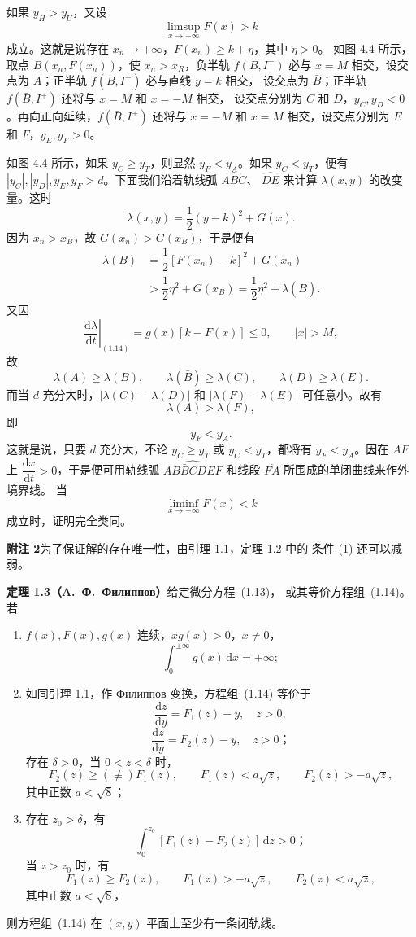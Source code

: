如果 $y_H>y_U$，又设
\[
  \limsup_{x\to+\infty}F(x)>k
\]
成立。这就是说存在 $x_n\to+\infty$，$F(x_n)\geq k+\eta$，其中 $\eta>0$。
如图 4.4 所示，取点 $B(x_n,F(x_n))$，使 $x_n>x_R$，负半轨 $f(B,I^-)$
必与 $x=M$ 相交，设交点为 $A$；正半轨 $f(B,I^+)$ 必与直线 $y=k$ 相交，
设交点为 $\bar B$；正半轨 $f(\bar B,I^+)$ 还将与 $x=M$ 和 $x=-M$ 相交，
设交点分别为 $C$ 和 $D$，$y_C,y_D<0$。再向正向延续，$f(\bar B,I^+)$ 还将与
$x=-M$ 和 $x=M$ 相交，设交点分别为 $E$ 和 $F$，$y_E,y_F>0$。

如图 4.4 所示，如果 $y_C\geq y_T$，则显然 $y_F<y_A$。如果 $y_C<y_T$，便有
$|y_C|,|y_D|,y_E,y_F>d$。下面我们沿着轨线弧 $\widehat{ABC}$、
$\widehat{DE}$ 来计算 $\lambda(x,y)$ 的改变量。这时
\[
  \lambda(x,y)=\dfrac12(y-k)^2+G(x).
\]
因为 $x_n>x_B$，故 $G(x_n)>G(x_B)$，于是便有
\[
\begin{aligned}
  \lambda(B)&=\dfrac12[F(x_n)-k]^2+G(x_n)\\
  &>\dfrac12\eta^2+G(x_B)
   =\dfrac12\eta^2+\lambda(\bar B).
\end{aligned}
\]
又因
\[
  \left.\dfrac{\mathrm{d}\lambda}{\mathrm{d}t}\right|_{(1.14)}
  =g(x)[k-F(x)]\leq0,\qquad |x|>M,
\]
故
\[
  \lambda(A)\geq\lambda(B),\qquad
  \lambda(\bar B)\geq\lambda(C),\qquad
  \lambda(D)\geq\lambda(E).
\]
而当 $d$ 充分大时，$|\lambda(C)-\lambda(D)|$ 和
$|\lambda(F)-\lambda(E)|$ 可任意小。故有
\[
  \lambda(A)>\lambda(F),
\]
即
\[
  y_F<y_A.
\]
这就是说，只要 $d$ 充分大，不论 $y_C\geq y_T$ 或 $y_C<y_T$，都将有
$y_F<y_A$。因在 $\overline{AF}$ 上 $\dfrac{\mathrm{d}x}{\mathrm{d}t}>0$，于是便可用轨线弧
$\widehat{AB\bar BCDEF}$ 和线段 $\overline{FA}$ 所围成的单闭曲线来作外境界线。
当
\[
  \liminf_{x\to-\infty}F(x)<k
\]
成立时，证明完全类同。

\noindent\textbf{附注 2}\quad 为了保证解的存在唯一性，由引理 1.1，定理 1.2 中的
条件 (1) 还可以减弱。

\noindent\textbf{定理 1.3（A.~Ф.~Филиппов\cite{8}）}\quad 给定微分方程~(1.13)，
或其等价方程组~(1.14)。若
\begin{enumerate}
  \item $f(x),F(x),g(x)$ 连续，$xg(x)>0$，$x\ne0$，
  \[
    \int_0^{\pm\infty}g(x)\,\mathrm{d}x=+\infty;
  \]
  \item 如同引理 1.1，作 Филиппов 变换，方程组~(1.14) 等价于
  \[
    \dfrac{\mathrm{d}z}{\mathrm{d}y}=F_1(z)-y,\quad z>0, \tag{1.16}
  \]
  \[
    \dfrac{\mathrm{d}z}{\mathrm{d}y}=F_2(z)-y,\quad z>0； \tag{1.17}
  \]
  存在 $\delta>0$，当 $0<z<\delta$ 时，
  \[
    F_2(z)\geq(\not\equiv)F_1(z),\qquad
    F_1(z)<a\sqrt z,\qquad F_2(z)>-a\sqrt z,
  \]
  其中正数 $a<\sqrt8$；
  \item 存在 $z_0>\delta$，有
  \[
    \int_0^{z_0}[F_1(z)-F_2(z)]\,\mathrm{d}z>0；
  \]
  当 $z>z_0$ 时，有
  \[
    F_1(z)\geq F_2(z),\qquad
    F_1(z)>-a\sqrt z,\qquad F_2(z)<a\sqrt z,
  \]
  其中正数 $a<\sqrt8$，
\end{enumerate}
则方程组~(1.14) 在 $(x,y)$ 平面上至少有一条闭轨线。

